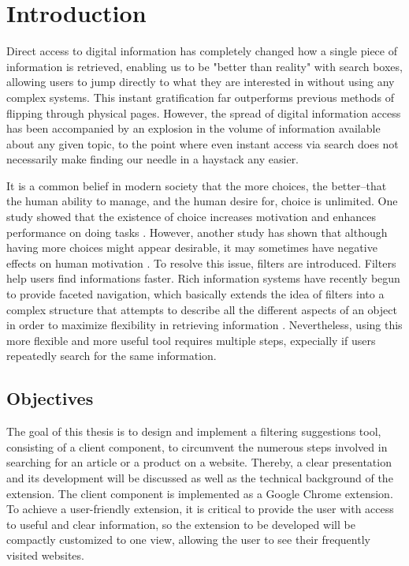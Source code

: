 \newpage
\chapter{Introduction}
Direct access to digital information has completely changed how a single piece of information is retrieved, enabling us to be "better than reality" with search boxes, allowing users to jump directly to what they are interested in without using any complex systems. This instant gratification far outperforms previous methods of flipping through physical pages. However, the spread of digital information access has been accompanied by an explosion in the volume of information available about any given topic, to the point where even instant access via search does not necessarily make finding our needle in a haystack any easier.

It is a common belief in modern society that the more choices, the better--that the human ability to manage, and the human desire for, choice is unlimited. One study showed that the existence of choice increases motivation and enhances performance on doing tasks \autocite{zuckerman1978importance}. However, another study has shown that although having more choices might appear desirable, it may sometimes have negative effects on human motivation \autocite{iyengar2000choice}. To resolve this issue, filters are introduced. Filters help users find informations faster. Rich information systems have recently begun to provide faceted navigation, which basically extends the idea of filters into a complex structure that attempts to describe all the different aspects of an object in order to maximize flexibility in retrieving information \autocite{whitenton2014filters}. Nevertheless, using this more flexible and more useful tool requires multiple steps, expecially if users repeatedly search for the same information.

\section{Objectives}
The goal of this thesis is to design and implement a filtering suggestions tool, consisting of a client component, to circumvent the numerous steps involved in searching for an article or a product on a website. Thereby, a clear presentation and its development will be discussed as well as the technical background of the extension. The client component is implemented as a Google Chrome extension. To achieve a user-friendly extension, it is critical to provide the user with access to useful and clear information, so the extension to be developed will be compactly customized to one view, allowing the user to see their frequently visited websites.


